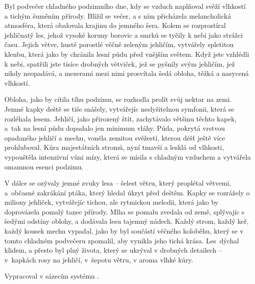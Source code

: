 \documentclass{article}
\begin{document}
\fontsize{10pt}{0pt}\selectfont%
\setlength{\parskip}{0pt}%
\setlength{\parindent}{2em}%
	\-\hspace{2em}Byl podvečer chladného podzimního dne, kdy se vzduch naplňoval svěží vlhkostí a tichým šuměním přírody.
	Blížil se večer, a s ním přicházela melancholická atmosféra, která obalovala krajinu do jemného šera.
	Kolem se rozprostíral jehličnatý les, jehož vysoké koruny borovic a smrků se tyčily k nebi jako strážci času.
	Jejich větve, hustě porostlé věčně zeleným jehličím, vytvářely spletitou klenbu, která jako by chránila lesní půdu před vnějším světem.
	Když jste vzhlédli k nebi, spatřili jste tisíce drobných větviček, jež se pyšnily svým jehličím, jež nikdy neopadává, a mezerami mezi nimi prosvítala šedá obloha, těžká a nasycená vlhkostí.\par
	Obloha, jako by cítila tíhu podzimu, se rozhodla prolít svůj nektar na zemi.
	Jemné kapky deště se tiše snášely, vytvářejíc neslyšitelnou symfonii, která se rozléhala lesem.
	Jehličí, jako přirozený štít, zachytávalo většinu těchto kapek, a~tak na lesní půdu dopadalo jen minimum vláhy.
	Půda, pokrytá vrstvou opadaného jehličí a mechu, voněla zemitou svěžestí, kterou déšť ještě více prohluboval.
	Kůra majestátních stromů, nyní tmavší a lesklá od vlhkosti, vypouštěla intenzivní vůni mízy, která se mísila s chladným vzduchem a vytvářela omamnou esenci podzimu.\par
	V dálce se ozývaly jemné zvuky lesa -- šelest větru, který proplétal větvemi, a~občasné zakrákání ptáka, který hledal úkryt před deštěm.
	Kapky se rozrážely o miliony jehliček, vytvářejíc tichou, ale rytmickou melodii, která jako by doprovázela pomalý tanec přírody.
	Mlha se pomalu zvedala od země, splývajíc s šedými odstíny oblohy, a dodávala lesu tajemný nádech.
	Každý strom, každý keř, každý kousek mechu vypadal, jako by byl součástí věčného koloběhu, který se v tomto chladném podvečeru zpomalil, aby vynikla jeho tichá krása.
	Les~dýchal klidem, a přesto byl plný života, který se ukrýval v drobných detailech -- v~kapkách rosy na jehličí, v~šepotu větru, v aroma vlhké kůry.
	\vfill
	\begin{flushright}
	\footnotesize Vypracoval  v sázecím systému .
	\end{flushright}
\end{document}
